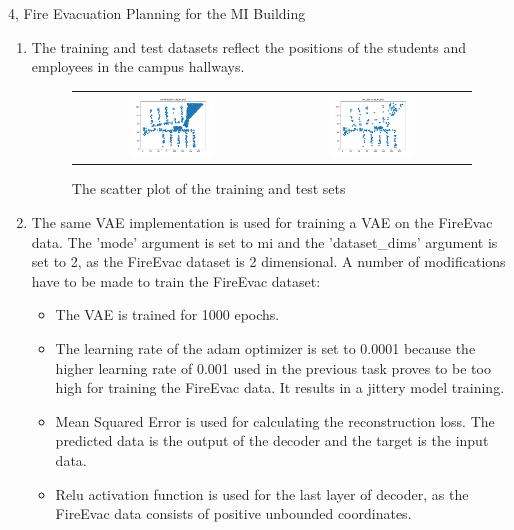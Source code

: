 \documentclass[10pt,a4paper]{article}
\begin{document}
\begin{task}{4, Fire Evacuation Planning for the MI Building}
\begin{enumerate}
	\item The training and test datasets reflect the positions of the students and employees in the campus hallways.
\begin{figure}[H]
\caption{The scatter plot of the training and test sets}
\label{fig:training-test-set} 
\begin{tabular}{cc}
	\includegraphics[width=0.45\textwidth]{../plots/task4/training_set_scatter.png} &   \includegraphics[width=0.45\textwidth]{../plots/task4/test_set_scatter.png} 
\end{tabular}
\end{figure}
	\item The same VAE implementation is used for training a VAE on the FireEvac data. The 'mode' argument is set to mi and the 'dataset\_dims' argument is set to 2, as the FireEvac dataset is 2 dimensional. A number of modifications have to be made to train the FireEvac dataset:
	\begin{itemize}
		\item The VAE is trained for 1000 epochs. 
		\item The learning rate of the adam optimizer is set to 0.0001 because the higher learning rate of 0.001 used in the previous task proves to be too high for training the FireEvac data. It results in a jittery model training.
		\item Mean Squared Error is used for calculating the reconstruction loss. The predicted data is the output of the decoder and the target is the input data.
		\item Relu activation function is used for the last layer of decoder, as the FireEvac data consists of positive unbounded coordinates.
	\end{itemize}
	

\end{enumerate}
\end{task}
\end{document}
